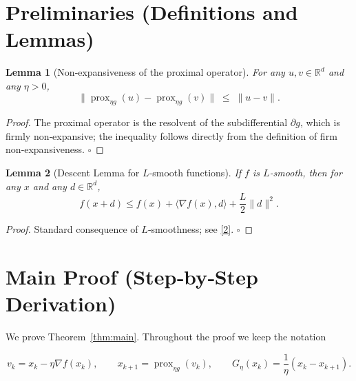 \documentclass{article}
\newtheorem{lemma}{Lemma}
\newcommand{\prox}{\operatorname{prox}}
\newcommand{\grad}{\nabla}
\newcommand{\R}{\mathbb{R}}
\begin{document}
\newpage

\section*{Preliminaries (Definitions and Lemmas)}
\begin{lemma}[Non‑expansiveness of the proximal operator]\label{lem:nonexp}
For any $u,v\in\R^{d}$ and any $\eta>0$,
\[
\bigl\|\prox_{\eta g}(u)-\prox_{\eta g}(v)\bigr\|
\;\le\;
\|u-v\|.
\]
\end{lemma}
\begin{proof}
The proximal operator is the resolvent of the subdifferential $\partial g$, which is firmly non‑expansive; the inequality follows directly from the definition of firm non‑expansiveness. \hfill $\square$
\end{proof}

\begin{lemma}[Descent Lemma for $L$‑smooth functions]\label{lem:descent}
If $f$ is $L$‑smooth, then for any $x$ and any $d\in\R^{d}$,
\[
f(x+d)\le f(x)+\langle\grad f(x),d\rangle+\frac{L}{2}\|d\|^{2}. \tag{5}
\]
\end{lemma}
\begin{proof}
Standard consequence of $L$‑smoothness; see \eqref{2}. \hfill $\square$
\end{proof}

\section*{Main Proof (Step‑by‑Step Derivation)}
We prove Theorem~\ref{thm:main}.  Throughout the proof we keep the notation  

\[
v_{k}=x_{k}-\eta\grad f(x_{k}),\qquad
x_{k+1}= \prox_{\eta g}(v_{k}),
\qquad
G_{\eta}(x_{k})=\frac{1}{\eta}(x_{k}-x_{k+1}).
\]
\end{document}
